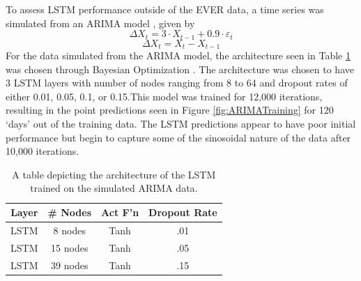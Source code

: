 To assess LSTM performance outside of the EVER data, a time series was simulated from an ARIMA model \citep{cowpertwait2009introductory}, given by
$$\Delta X_t = 3\cdot X_{t-1} + 0.9\cdot \varepsilon_t$$
$$\Delta X_t = X_t - X_{t-1}$$
For the data simulated from the ARIMA model, the architecture seen in Table \ref{tab:ARIMAArchitecture} was chosen through Bayesian Optimization \citep{snoek2012practical}. The architecture was chosen to have 3 LSTM layers with number of nodes ranging from 8 to 64 and dropout rates of either 0.01, 0.05, 0.1, or 0.15.This model was trained for 12,000 iterations, resulting in the point predictions seen in Figure \ref{fig:ARIMATraining} for 120 `days' out of the training data. The LSTM predictions appear to have poor initial performance but begin to capture some of the sinosoidal nature of the data after 10,000 iterations.
\begin{table}[hbt!]
\centering
\begin{tabular}{|c|c|c|c|}
    \hline 
    Layer & \# Nodes & Act F'n & Dropout Rate \\
    \hline
    LSTM & 8 nodes & Tanh  & .01  \\
    \hline
    LSTM & 15 nodes & Tanh & .05\\
    \hline
    LSTM & 39 nodes & Tanh & .15\\
    \hline
\end{tabular}
\caption{A table depicting the architecture of the LSTM trained on the simulated ARIMA data.}
\label{tab:ARIMAArchitecture}
\end{table}

